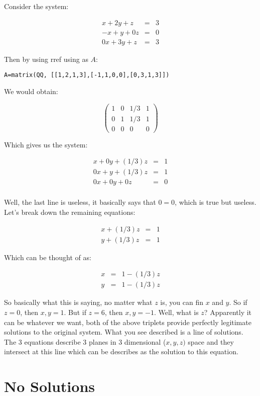 \documentclass[10pt]{article}
\theoremstyle{definition}
\begin{document}
Consider the system:


\begin{eqnarray*}
x+2y+z&=&3\\
-x+y+0z&=&0\\
0x+3y+z&=&3
\end{eqnarray*}

Then by using rref using as $A$:


\begin{verbatim}
A=matrix(QQ, [[1,2,1,3],[-1,1,0,0],[0,3,1,3]])
\end{verbatim}

We would obtain:


$$ \left( \begin{array}{rrr|r}
1 & 0 & 1/3& 1\\
0 & 1 & 1/3 & 1\\
0 & 0 & 0 & 0
\end{array}\right)$$

Which gives us the system:

\begin{eqnarray*}
x+0y+(1/3)z&=&1\\
0x+y+(1/3)z&=&1\\
0x+0y+0z&=&0\\
\end{eqnarray*}

Well, the last line is useless, it basically says that $0=0$, which is true but useless.  Let's break down the remaining equations:

\begin{eqnarray*}
x+(1/3)z&=&1\\
y+(1/3)z&=&1
\end{eqnarray*}

Which can be thought of as:

\begin{eqnarray*}
x&=&1-(1/3)z\\
y&=&1-(1/3)z
\end{eqnarray*}

So basically what this is saying, no matter what $z$ is, you can fin $x$ and $y$.  So if $z=0$, then $x,y=1$. But if $z=6$, then $x,y=-1$.  Well, what is $z$?  Apparently it can be whatever we want, both of the above triplets provide perfectly legitimate solutions to the original system.  What you see described is a line of solutions.  The 3 equations describe 3 planes in 3 dimensional ($x,y,z)$ space and they intersect at this line which can be describes as the solution to this equation.

\section{No Solutions}
\end{document}
